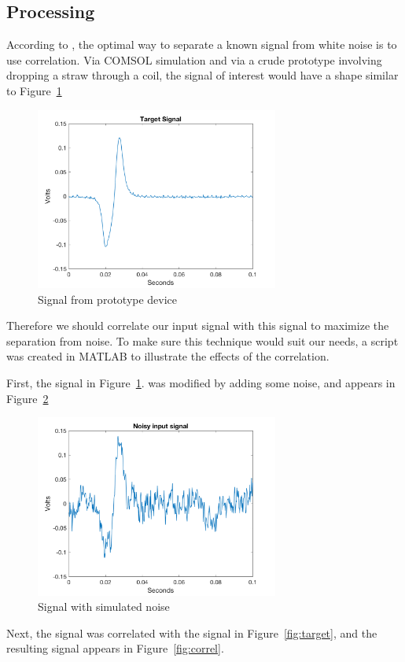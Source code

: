 \documentclass[10pt, journal]{IEEEtran}
\begin{document}
\subsection{Processing}

According to \cite{dspguide}, the optimal way to separate a known
signal from white noise is to use correlation. Via COMSOL simulation
and via a crude prototype involving dropping a straw through a coil,
the signal of interest would have a shape similar to Figure
\,\ref{fig:input} \par
\begin{figure}[ht!]
  \includegraphics[width=8cm]{../matlab/plot5.png}
  \caption{Signal from prototype device}
  \label{fig:input}
  \end{figure}
Therefore we should
correlate our input signal with this signal to maximize the separation
from noise. To make sure this technique would suit our needs, a script
was created in MATLAB to illustrate the effects of the correlation.

First, the signal in Figure \,\ref{fig:input}. was modified by adding some noise, and appears in Figure \,\ref{fig:noisy}
\begin{figure}[h]
  \includegraphics[width=8cm]{../matlab/plot1.png}
  \caption{Signal with simulated noise}
  \label{fig:noisy}
\end{figure}
Next, the signal was correlated with the signal in Figure \,\ref{fig:target}, and the resulting signal appears in Figure \,\ref{fig:correl}.
\end{document}

